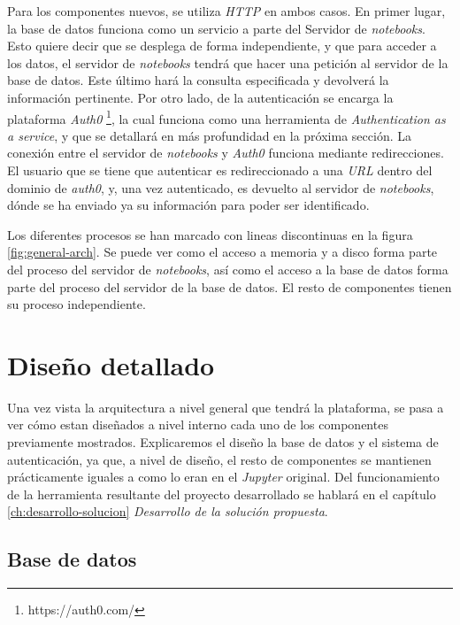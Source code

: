 \documentclass[11pt,spanish,listoffigures]{tfgetsinf}
\begin{document}
Para los componentes nuevos, se utiliza \textit{HTTP} en ambos casos. En primer lugar, la base de datos funciona como un servicio a parte del Servidor de \textit{notebooks}. Esto quiere decir que se desplega de forma independiente, y que para acceder a los datos, el servidor de \textit{notebooks} tendrá que hacer una petición al servidor de la base de datos. Este último hará la consulta especificada y devolverá la información pertinente. Por otro lado, de la autenticación se encarga la plataforma \textit{Auth0} \footnote{https://auth0.com/}, la cual funciona como una herramienta de \textit{Authentication as a service}, y que se detallará en más profundidad en la próxima sección. La conexión entre el servidor de \textit{notebooks} y \textit{Auth0} funciona mediante redirecciones. El usuario que se tiene que autenticar es redireccionado a una \textit{URL} dentro del dominio de \textit{auth0}, y, una vez autenticado, es devuelto al servidor de \textit{notebooks}, dónde se ha enviado ya su información para poder ser identificado. 

Los diferentes procesos se han marcado con lineas discontinuas en la figura \ref{fig:general-arch}. Se puede ver como el acceso a memoria y a disco forma parte del proceso del servidor de \textit{notebooks}, así como el acceso a la base de datos forma parte del proceso del servidor de la base de datos. El resto de componentes tienen su proceso independiente.



\section{Diseño detallado}
\label{sec:diseno-detallado}

Una vez vista la arquitectura a nivel general que tendrá la plataforma, se pasa a ver cómo estan diseñados a nivel interno cada uno de los componentes previamente mostrados. Explicaremos  el diseño la base de datos y el sistema de autenticación, ya que, a nivel de diseño, el resto de componentes se mantienen prácticamente iguales a como lo eran en el \textit{Jupyter} original. Del funcionamiento de la herramienta resultante del proyecto desarrollado se hablará en el capítulo \ref{ch:desarrollo-solucion} \textit{Desarrollo de la solución propuesta}.


\subsection{Base de datos}
\label{subsec:diseno-bd}
\end{document}
